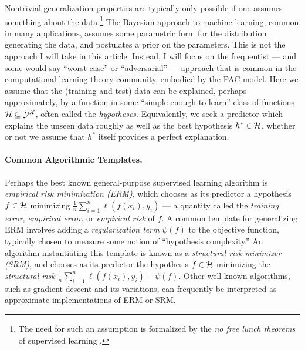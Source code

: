 Nontrivial generalization properties are typically only possible if one assumes something about the data.\footnote{The need for such an assumption is formalized by the  \emph{no free lunch theorems} of supervised learning \cite{wolpert_connection_1992,wolpert_lack_1996,schaffer_conservation_1994}.} The Bayesian approach to  machine learning, common in many applications, assumes some parametric form for the distribution generating the data, and postulates a prior on the parameters. This is not the approach I will take in this article. Instead, I will focus on the frequentist --- and some would say ``worst-case'' or ``adversarial'' ---  approach that is common in the computational learning theory community, embodied by the PAC model. Here we assume that the (training and test) data can be explained, perhaps approximately, by a function in some ``simple enough to learn'' class of functions $\mathcal{H} \subseteq \mathcal{Y}^{\mathcal{X}}$, often called the \emph{hypotheses}. Equivalently, we  seek a predictor which explains the unseen data roughly  as well as the best hypothesis $h^* \in \mathcal{H}$, whether or not we assume that $h^*$ itself provides a perfect explanation.



 \paragraph{Common Algorithmic Templates.} Perhaps the best known general-purpose supervised learning algorithm is \emph{empirical risk minimization (ERM)}, which chooses as its predictor a hypothesis $f \in \mathcal{H}$ minimizing $\frac{1}{n} \sum_{i=1}^n \ell(f(x_i),y_i)$ --- a quantity called the \emph{training error}, \emph{empirical error}, or \emph{empirical risk} of $f$. %
A common template for generalizing ERM involves adding a \emph{regularization term} $\psi(f)$ to the  objective function, typically chosen to measure some notion of ``hypothesis complexity.'' An algorithm instantiating this template is known as a \emph{structural risk minimizer (SRM)}, and chooses as its predictor the hypothesis $f \in \mathcal{H}$ minimizing the \emph{structural risk} $\frac{1}{n} \sum_{i=1}^n \ell(f(x_i),y_i) + \psi(f)$. Other well-known algorithms, such as gradient descent and its variations,  can frequently be interpreted as approximate implementations of ERM or SRM.


